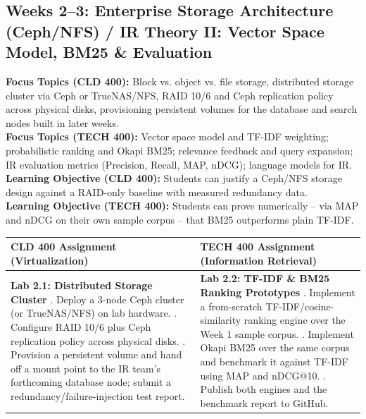 \documentclass[10pt, a4paper]{article}
\begin{document}
\subsection*{Weeks 2--3: Enterprise Storage Architecture (Ceph/NFS) / IR Theory II: Vector Space Model, BM25 \& Evaluation}
\textbf{Focus Topics (CLD 400):} Block vs. object vs. file storage, distributed storage cluster via Ceph or TrueNAS/NFS, RAID 10/6 and Ceph replication policy across physical disks, provisioning persistent volumes for the database and search nodes built in later weeks. \\[0.35em]
\textbf{Focus Topics (TECH 400):} Vector space model and TF-IDF weighting; probabilistic ranking and Okapi BM25; relevance feedback and query expansion; IR evaluation metrics (Precision, Recall, MAP, nDCG); language models for IR. \\[0.35em]
\textbf{Learning Objective (CLD 400):} Students can justify a Ceph/NFS storage design against a RAID-only baseline with measured redundancy data. \\[0.35em]
\textbf{Learning Objective (TECH 400):} Students can prove numerically -- via MAP and nDCG on their own sample corpus -- that BM25 outperforms plain TF-IDF.

\begin{table}[H]
\centering
\small
\renewcommand{\arraystretch}{1.2}
\begin{tabularx}{\textwidth}{|X|X|}
\hline
\rowcolor{lightgray}
\textbf{CLD 400 Assignment (Virtualization)} & \textbf{TECH 400 Assignment (Information Retrieval)} \\ \hline
\textbf{Lab 2.1: Distributed Storage Cluster} \newline
1. Deploy a 3-node Ceph cluster (or TrueNAS/NFS) on lab hardware. \newline
2. Configure RAID 10/6 plus Ceph replication policy across physical disks. \newline
3. Provision a persistent volume and hand off a mount point to the IR team's forthcoming database node; submit a redundancy/failure-injection test report. & \textbf{Lab 2.2: TF-IDF \& BM25 Ranking Prototypes} \newline
1. Implement a from-scratch TF-IDF/cosine-similarity ranking engine over the Week 1 sample corpus. \newline
2. Implement Okapi BM25 over the same corpus and benchmark it against TF-IDF using MAP and nDCG@10. \newline
3. Publish both engines and the benchmark report to GitHub. \\ \hline
\end{tabularx}
\end{table}
\end{document}
